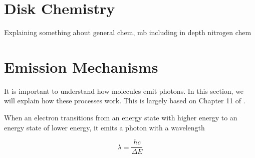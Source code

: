 \documentclass[twoside, single, authoryear, semicolon]{lion-msc}
\newcommand{\4}{$_4$}
\newcommand{\3}{$_3$}
\newcommand{\2}{$_2$}
\begin{document}



\section{Disk Chemistry}
Explaining something about general chem, mb including in depth nitrogen chem

\section{Emission Mechanisms}
It is important to understand how molecules emit photons. In this section, we will explain how these processes work. This is largely based on Chapter 11 of \cite{1979rpa..book.....R}. 

When an electron transitions from an energy state with higher energy to an energy state of lower energy, it emits a photon with a wavelength

\begin{equation}
    \lambda=\frac{hc}{\Delta E}
\end{equation}
\end{document}
